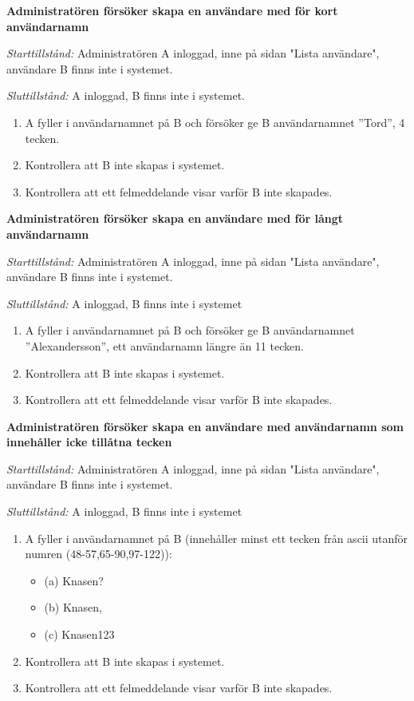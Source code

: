 \documentclass[a4paper]{article}
\begin{document}
\begin{FT}
\item
\textbf{Administratören försöker skapa en användare med för kort användarnamn}

\emph{Starttillstånd:} Administratören A inloggad, inne på sidan "Lista användare", användare B finns inte i systemet.

\emph{Sluttillstånd:} A inloggad, B finns inte i systemet.

\begin{enumerate}
\item A fyller i användarnamnet på B och försöker ge B användarnamnet ''Tord'', 4 tecken.
\item Kontrollera att B inte skapas i systemet.
\item Kontrollera att ett felmeddelande visar varför B inte skapades.
\end{enumerate}

\item
\textbf{Administratören försöker skapa en användare med för långt användarnamn}

\emph{Starttillstånd:} Administratören A inloggad, inne på sidan "Lista användare", användare B finns inte i systemet.

\emph{Sluttillstånd:} A inloggad, B finns inte i systemet

\begin{enumerate}
\item A fyller i användarnamnet på B och försöker ge B användarnamnet ''Alexandersson'', ett användarnamn längre än 11 tecken.
\item Kontrollera att B inte skapas i systemet.
\item Kontrollera att ett felmeddelande visar varför B inte skapades.
\end{enumerate}

\item
\textbf{Administratören försöker skapa en användare med användarnamn som innehåller icke tillåtna tecken}

\emph{Starttillstånd:} Administratören A inloggad, inne på sidan "Lista användare", användare B finns inte i systemet.

\emph{Sluttillstånd:} A inloggad, B finns inte i systemet

\begin{enumerate}
\item A fyller i användarnamnet på B (innehåller minst ett tecken från ascii utanför numren (48-57,65-90,97-122)):
\begin{itemize}
\item [] (a) Knasen? %
\item [] (b) Knasen,
\item [] (c) Knasen123
\end{itemize}
\item Kontrollera att B inte skapas i systemet.
\item Kontrollera att ett felmeddelande visar varför B inte skapades.
\end{enumerate}


\end{FT}
\end{document}
